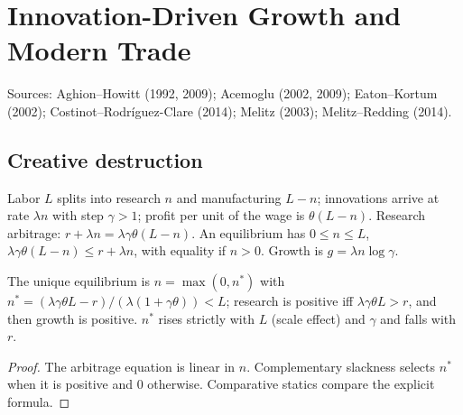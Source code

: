 \chapter{Innovation-Driven Growth and Modern Trade}
\label{chap:growth_trade}

Sources: Aghion--Howitt (1992, 2009); Acemoglu (2002, 2009); Eaton--Kortum (2002); Costinot--Rodr\'iguez-Clare (2014);
Melitz (2003); Melitz--Redding (2014).

\section{Creative destruction}

\begin{definition}
\label{def:aghion_howitt}
\leanok
Labor $L$ splits into research $n$ and manufacturing $L-n$; innovations arrive at rate $\lambda n$ with step $\gamma>1$; profit per unit
of the wage is $\theta(L-n)$. Research arbitrage: $r+\lambda n=\lambda\gamma\theta(L-n)$. An equilibrium has $0\le n\le L$,
$\lambda\gamma\theta(L-n)\le r+\lambda n$, with equality if $n>0$. Growth is $g=\lambda n\log\gamma$.
\end{definition}

\begin{theorem}
\label{thm:aghion_howitt}
\leanok
{}
The unique equilibrium is $n=\max(0,n^*)$ with $n^*=(\lambda\gamma\theta L-r)/(\lambda(1+\gamma\theta))<L$; research is positive iff
$\lambda\gamma\theta L>r$, and then growth is positive. $n^*$ rises strictly with $L$ (scale effect) and $\gamma$ and falls with $r$.
\end{theorem}
\begin{proof}
\leanok
The arbitrage equation is linear in $n$. Complementary slackness selects $n^*$ when it is positive and $0$ otherwise.
Comparative statics compare the explicit formula.
\end{proof}


